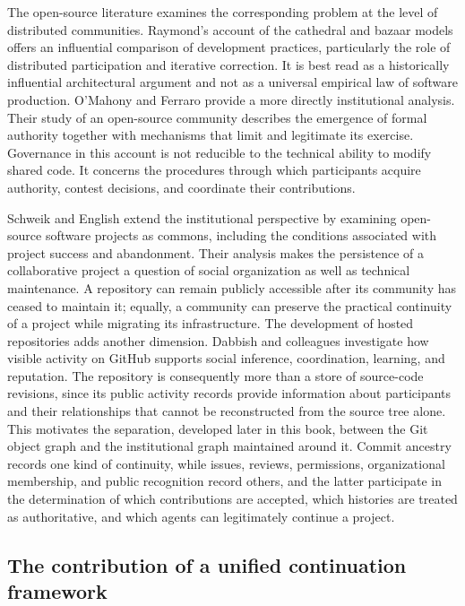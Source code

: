 \documentclass[11pt,twoside,openright]{book}
\theoremstyle{plain}
\theoremstyle{definition}
\theoremstyle{remark}
\begin{document}
The open-source literature examines the corresponding problem at the level of distributed communities. Raymond's account of the cathedral and bazaar models \cite{raymond1998} offers an influential comparison of development practices, particularly the role of distributed participation and iterative correction. It is best read as a historically influential architectural argument and not as a universal empirical law of software production. O'Mahony and Ferraro \cite{omahony2007} provide a more directly institutional analysis. Their study of an open-source community describes the emergence of formal authority together with mechanisms that limit and legitimate its exercise. Governance in this account is not reducible to the technical ability to modify shared code. It concerns the procedures through which participants acquire authority, contest decisions, and coordinate their contributions.

Schweik and English \cite{schweik2012} extend the institutional perspective by examining open-source software projects as commons, including the conditions associated with project success and abandonment. Their analysis makes the persistence of a collaborative project a question of social organization as well as technical maintenance. A repository can remain publicly accessible after its community has ceased to maintain it; equally, a community can preserve the practical continuity of a project while migrating its infrastructure. The development of hosted repositories adds another dimension. Dabbish and colleagues \cite{dabbish2012} investigate how visible activity on GitHub supports social inference, coordination, learning, and reputation. The repository is consequently more than a store of source-code revisions, since its public activity records provide information about participants and their relationships that cannot be reconstructed from the source tree alone. This motivates the separation, developed later in this book, between the Git object graph and the institutional graph maintained around it. Commit ancestry records one kind of continuity, while issues, reviews, permissions, organizational membership, and public recognition record others, and the latter participate in the determination of which contributions are accepted, which histories are treated as authoritative, and which agents can legitimately continue a project.

\subsection*{The contribution of a unified continuation framework}
\end{document}
